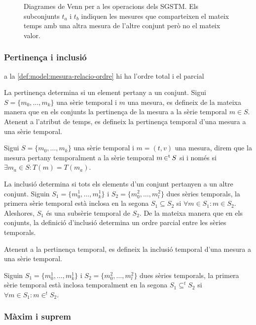 \begin{figure}[tp]
  \centering
  
  \caption{Diagrames de Venn per a les operacions dels SGSTM. Els
    subconjunts $t_a$ i $t_b$ indiquen les mesures que comparteixen el
    mateix temps amb una altra mesura de l'altre conjunt però no el
    mateix valor.}
  \label{fig:model:sgst:venn}
\end{figure}


\subsubsection{Pertinença i inclusió}


a la \autoref{def:model:mesura-relacio-ordre} hi ha l'ordre total i el parcial

La pertinença determina si un element pertany a un conjunt.  Sigui
$S=\{m_0,\ldots,m_k\}$ una sèrie temporal i $m$ una mesura, es
defineix de la mateixa manera que en els conjunts la pertinença de la
mesura a la sèrie temporal $m \in S$. Atenent a l'atribut de temps, es
defineix la pertinença temporal d'una mesura a una sèrie temporal.
\begin{definition}
  Sigui $S=\{m_0,\ldots,m_k\}$ una sèrie temporal i $m=(t,v)$ una
  mesura, direm que la mesura pertany temporalment a la sèrie
  temporal $m \operatorname*{\in^t} S$ si i només si $\exists m_a \in S : T(m) =
  T(m_a)$.
\end{definition}


La inclusió determina si tots els elements d'un conjunt pertanyen a un
altre conjunt. Siguin $S_1=\{m_0^1,\ldots,m_k^1\}$ i
$S_2=\{m_0^2,\ldots,m_l^2\}$ dues sèries temporals, la primera sèrie
temporal està inclosa en la segona $S_1 \subseteq S_2$ si $\forall m
\in S_1: m \in S_2$. Aleshores, $S_1$ és una subsèrie temporal de
$S_2$. De la mateixa manera que en els conjunts, la definició
d'inclusió determina un ordre parcial entre les sèries temporals.

Atenent a la pertinença temporal, es defineix la inclusió temporal
d'una mesura a una sèrie temporal.
\begin{definition}
  Siguin $S_1=\{m_0^1,\ldots,m_k^1\}$ i $S_2=\{m_0^2,\ldots,m_l^2\}$
  dues sèries temporals, la primera sèrie temporal està inclosa
  temporalment en la segona $S_1 \subseteq^t S_2$ si $\forall m \in
  S_1: m \in^t S_2$.
\end{definition}


\subsubsection{Màxim i suprem}

